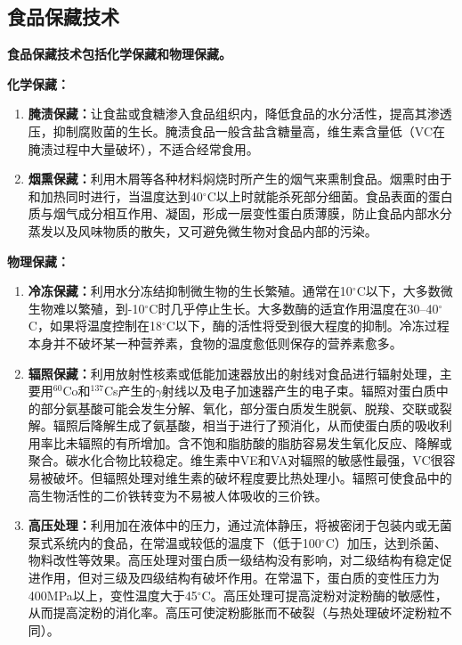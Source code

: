 \subsection{食品保藏技术}

\begin{tipbox}
\textbf{食品保藏技术包括化学保藏和物理保藏。}%

\textbf{化学保藏：}
\begin{enumerate}[leftmargin=*]
    \item \textbf{腌渍保藏：}让食盐或食糖渗入食品组织内，降低食品的水分活性，提高其渗透压，抑制腐败菌的生长。腌渍食品一般含盐含糖量高，维生素含量低（VC在腌渍过程中大量破坏），不适合经常食用。
    \item \textbf{烟熏保藏：}利用木屑等各种材料焖烧时所产生的烟气来熏制食品。烟熏时由于和加热同时进行，当温度达到40$^\circ$C以上时就能杀死部分细菌。食品表面的蛋白质与烟气成分相互作用、凝固，形成一层变性蛋白质薄膜，防止食品内部水分蒸发以及风味物质的散失，又可避免微生物对食品内部的污染。
\end{enumerate}

\textbf{物理保藏：}
\begin{enumerate}[leftmargin=*]
    \item \textbf{冷冻保藏：}利用水分冻结抑制微生物的生长繁殖。通常在10$^\circ$C以下，大多数微生物难以繁殖，到-10$^\circ$C时几乎停止生长。大多数酶的适宜作用温度在30--40$^\circ$C，如果将温度控制在18$^\circ$C以下，酶的活性将受到很大程度的抑制。冷冻过程本身并不破坏某一种营养素，食物的温度愈低则保存的营养素愈多。
    \item \textbf{辐照保藏：}利用放射性核素或低能加速器放出的射线对食品进行辐射处理，主要用$^{60}$Co和$^{137}$Cs产生的$\gamma$射线以及电子加速器产生的电子束。辐照对蛋白质中的部分氨基酸可能会发生分解、氧化，部分蛋白质发生脱氨、脱羧、交联或裂解。辐照后降解生成了氨基酸，相当于进行了预消化，从而使蛋白质的吸收利用率比未辐照的有所增加。含不饱和脂肪酸的脂肪容易发生氧化反应、降解或聚合。碳水化合物比较稳定。维生素中VE和VA对辐照的敏感性最强，VC很容易被破坏。但辐照处理对维生素的破坏程度要比热处理小。辐照可使食品中的高生物活性的二价铁转变为不易被人体吸收的三价铁。
    \item \textbf{高压处理：}利用加在液体中的压力，通过流体静压，将被密闭于包装内或无菌泵式系统内的食品，在常温或较低的温度下（低于100$^\circ$C）加压，达到杀菌、物料改性等效果。高压处理对蛋白质一级结构没有影响，对二级结构有稳定促进作用，但对三级及四级结构有破坏作用。在常温下，蛋白质的变性压力为400MPa以上，变性温度大于45$^\circ$C。高压处理可提高淀粉对淀粉酶的敏感性，从而提高淀粉的消化率。高压可使淀粉膨胀而不破裂（与热处理破坏淀粉粒不同）。
\end{enumerate}
\end{tipbox}

